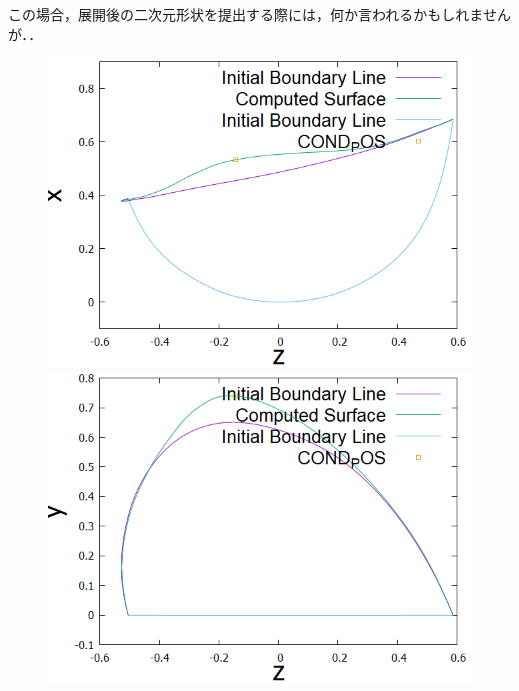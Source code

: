 \documentclass[16.7pt]{jsarticle}
\begin{document}
	この場合，展開後の二次元形状を提出する際には，何か言われるかもしれませんが．．
	\begin{figure}[h]
		\centering
		\begin{minipage}{0.45\hsize}
			\centering
			\includegraphics[scale = 0.3]{./figure/05Plus/ObtainedRidgeLinefromz-x.png}
		\end{minipage}
		\begin{minipage}{0.45\hsize}
			\centering
			\includegraphics[scale = 0.3]{./figure/05Plus/ObtainedRidgeLinefromz-y.png}
		\end{minipage}
	\end{figure}
\end{document}
